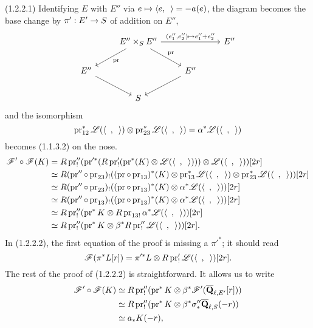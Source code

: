 \documentclass[deligne.tex]{subfiles}
\begin{document}
(1.2.2.1)
Identifying $E$ with $E''$
via $e\mapsto\langle e,\enskip\rangle=-a(e)$, the diagram becomes the base
change by $\pi':E'\rightarrow S$ of addition on $E''$,
\begin{equation*}\begin{tikzcd}
	&E''\times_SE''\arrow[rr,"{(e_1'',e_2'')\mapsto e_1''+e_2''}"]\arrow[dl,"\pr"]\arrow[dr,"\pr"]&&E'' \\
	E''\arrow[dr]&&E''\arrow[dl] \\
	&S
\end{tikzcd}\end{equation*}
and the isomorphism
\begin{equation*}
	\operatorname{pr}_{12}^*\mathscr L(\langle\enskip,\enskip\rangle)\otimes
	\operatorname{pr}_{23}^*\mathscr L(\langle\enskip,\enskip\rangle)
	=\alpha^*\mathscr L(\langle\enskip,\enskip\rangle)
\end{equation*}
becomes (1.1.3.2) on the nose.
\begin{align*}
	\mathscr F'\circ\mathscr F(K)
	&=R\operatorname{pr}_!''(\operatorname{pr}'^*(R\operatorname{pr}_!'(\operatorname{pr}^*(K)\otimes\mathscr L(\langle\enskip,\enskip\rangle)))\otimes\mathscr L(\langle\enskip,\enskip\rangle))[2r] \\
	&\simeq R(\operatorname{pr}''\circ\operatorname{pr}_{23})_!((\operatorname{pr}\circ\operatorname{pr}_{13})^*(K)\otimes\operatorname{pr}_{13}^*\mathscr L(\langle\enskip,\enskip\rangle)\otimes\operatorname{pr}_{23}^*\mathscr L(\langle\enskip,\enskip\rangle))[2r] \\
	&\simeq R(\operatorname{pr}''\circ\operatorname{pr}_{23})_!((\operatorname{pr}\circ\operatorname{pr}_{13})^*(K)\otimes\alpha^* \mathscr L(\langle\enskip,\enskip\rangle))[2r] \\
	&\simeq R(\operatorname{pr}''\circ\operatorname{pr}_{13})_!((\operatorname{pr}\circ\operatorname{pr}_{13})^*(K)\otimes\alpha^* \mathscr L(\langle\enskip,\enskip\rangle))[2r] \\
	&\simeq R\operatorname{pr}''_!(\operatorname{pr}^*K\otimes R\operatorname{pr}_{13!}\alpha^* \mathscr L(\langle\enskip,\enskip\rangle))[2r] \\
	&\simeq R\operatorname{pr}''_!(\operatorname{pr}^*K\otimes \beta^*R\operatorname{pr}''_! \mathscr L(\langle\enskip,\enskip\rangle))[2r].
\end{align*}
In (1.2.2.2), the first equation of the proof is missing a $\pi'^*$; it
should read
\begin{equation*}
	\mathscr F(\pi^*L[r])=\pi'^*L\otimes R\operatorname{pr}_!'\mathscr L(\langle\enskip,\enskip\rangle)[2r].
\end{equation*}
The rest of the proof of (1.2.2.2) is straightforward. It allows us to write
\begin{align*}
	\mathscr F'\circ\mathscr F(K)
	&\simeq R\operatorname{pr}''_!(\operatorname{pr}^*K\otimes \beta^*\mathscr F'(\overline{\mathbf{Q}}_{\ell,E'}[r])) \\
	&\simeq R\operatorname{pr}''_!(\operatorname{pr}^*K\otimes \beta^*\sigma''_*\overline{\mathbf{Q}}_{\ell,S}(-r)) \\
	&\simeq a_*K(-r),
\end{align*}
\end{document}
